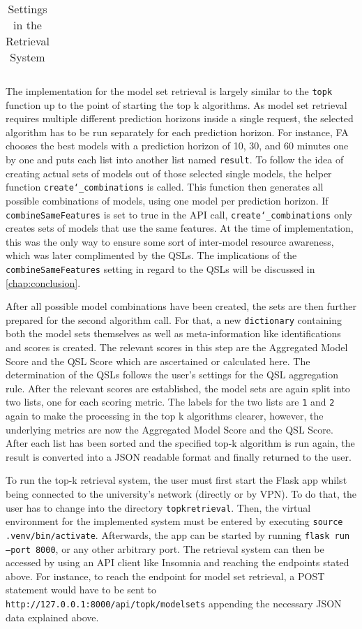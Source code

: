 \begin{table}[h]
\begin{tabular}{  l  p{7cm}  p{3cm} }
        \bottomrule
    \end{tabular}
\caption{Settings in the Retrieval System} \label{settings}
\end{table}


The implementation for the model set retrieval is largely similar to the \texttt{topk} function up to the point of starting the top k algorithms. As model set retrieval requires multiple different prediction horizons inside a single request, the selected algorithm has to be run separately for each prediction horizon. For instance, FA chooses the best models with a prediction horizon of 10, 30, and 60 minutes one by one and puts each list into another list named \texttt{result}. To follow the idea of creating actual sets of models out of those selected single models, the helper function \texttt{create\char`_combinations} is called. This function then generates all possible combinations of models, using one model per prediction horizon. If \texttt{combineSameFeatures} is set to true in the API call, \texttt{create\char`_combinations} only creates sets of models that use the same features. At the time of implementation, this was the only way to ensure some sort of inter-model resource awareness, which was later complimented by the QSLs. The implications of the \texttt{combineSameFeatures} setting in regard to the QSLs will be discussed in \autoref{chap:conclusion}.

After all possible model combinations have been created, the sets are then further prepared for the second algorithm call. For that, a new \texttt{dictionary} containing both the model sets themselves as well as meta-information like identifications and scores is created. The relevant scores in this step are the Aggregated Model Score and the QSL Score which are ascertained or calculated here. The determination of the QSLs follows the user's settings for the QSL aggregation rule. After the relevant scores are established, the model sets are again split into two lists, one for each scoring metric. The labels for the two lists are \texttt{1} and \texttt{2} again to make the processing in the top k algorithms clearer, however, the underlying metrics are now the Aggregated Model Score and the QSL Score. After each list has been sorted and the specified top-k algorithm is run again, the result is converted into a JSON readable format and finally returned to the user.

To run the top-k retrieval system, the user must first start the Flask app whilst being connected to the university's network (directly or by VPN). To do that, the user has to change into the directory \texttt{topkretrieval}. Then, the virtual environment for the implemented system must be entered by executing \texttt{source .venv/bin/activate}. Afterwards, the app can be started by running \texttt{flask run --port 8000}, or any other arbitrary port. The retrieval system can then be accessed by using an API client like Insomnia and reaching the endpoints stated above. For instance, to reach the endpoint for model set retrieval, a POST statement would have to be sent to \texttt{http://127.0.0.1:8000/api/topk/modelsets} appending the necessary JSON data explained above.

